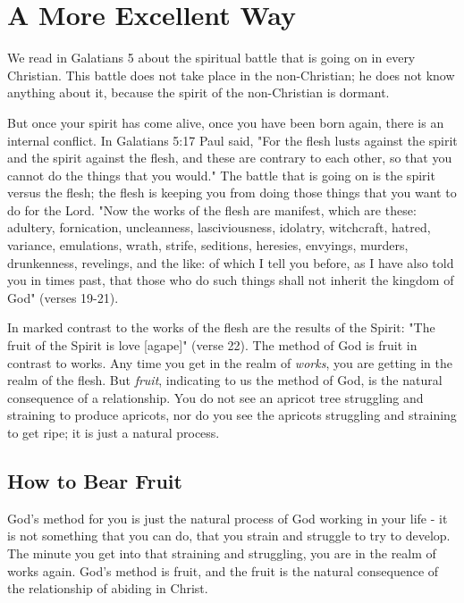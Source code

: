 \chapter{A More Excellent Way}

We read in Galatians 5 about the spiritual battle that is going on in every Christian. This battle does not take place in the non-Christian; he does not know anything about it, because the spirit of the non-Christian is dormant. 

But once your spirit has come alive, once you have been born again, there is an internal conflict. In Galatians 5:17 Paul said, "For the flesh lusts against the spirit and the spirit against the flesh, and these are contrary to each other, so that you cannot do the things that you would." The battle that is going on is the spirit versus the flesh; the flesh is keeping you from doing those things that you want to do for the Lord. "Now the works of the flesh are manifest, which are these: adultery, fornication, uncleanness, lasciviousness, idolatry, witchcraft, hatred, variance, emulations, wrath, strife, seditions, heresies, envyings, murders, drunkenness, revelings, and the like: of which I tell you before, as I have also told you in times past, that those who do such things shall not inherit the kingdom of God" (verses 19-21). 

In marked contrast to the works of the flesh are the results of the Spirit: "The fruit of the Spirit is love [agape]" (verse 22). The method of God is fruit in contrast to works. Any time you get in the realm of \emph{works}, you are getting in the realm of the flesh. But \emph{fruit}, indicating to us the method of God, is the natural consequence of a relationship. You do not see an apricot tree struggling and straining to produce apricots, nor do you see the apricots struggling and straining to get ripe; it is just a natural process. 

\section*{How to Bear Fruit}

God's method for you is just the natural process of God working in your life - it is not something that you can do, that you strain and struggle to try to develop. The minute you get into that straining and struggling, you are in the realm of works again. God's method is fruit, and the fruit is the natural consequence of the relationship of abiding in Christ. 

